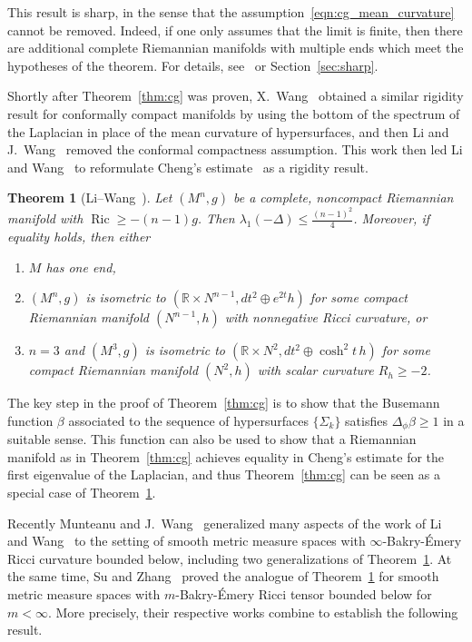 \documentclass{amsart}
\newtheorem{thm}{Theorem}[section]
\theoremstyle{definition}
\theoremstyle{remark}
\numberwithin{equation}{section}
\begin{document}
This result is sharp, in the sense that the assumption~\eqref{eqn:cg_mean_curvature} cannot be removed.  Indeed, if one only assumes that the limit is finite, then there are additional complete Riemannian manifolds with multiple ends which meet the hypotheses of the theorem.  For details, see~\cite{CaiGalloway1999} or Section~\ref{sec:sharp}.

Shortly after Theorem~\ref{thm:cg} was proven, X.\ Wang~\cite{Wang2001} obtained a similar rigidity result for conformally compact manifolds by using the bottom of the spectrum of the Laplacian in place of the mean curvature of hypersurfaces, and then Li and J.\ Wang~\cite{LiWang2001} removed the conformal compactness assumption.  This work then led Li and Wang~\cite{LiWang2002} to reformulate Cheng's estimate~\cite{Cheng1975} as a rigidity result.

\begin{thm}[Li--Wang~\cite{LiWang2002}]
\label{thm:lw}
Let $(M^n,g)$ be a complete, noncompact Riemannian manifold with $\operatorname{Ric}\geq-(n-1)g$.  Then $\lambda_1(-\Delta)\leq\frac{(n-1)^2}{4}$.  Moreover, if equality holds, then either
\begin{enumerate}
\item $M$ has one end,
\item $(M^n,g)$ is isometric to $({\mathbb{R}}\times N^{n-1},dt^2\oplus e^{2t}h)$ for some compact Riemannian manifold $(N^{n-1},h)$ with nonnegative Ricci curvature, or
\item $n=3$ and $(M^3,g)$ is isometric to $({\mathbb{R}}\times N^2,dt^2\oplus\cosh^2t\,h)$ for some compact Riemannian manifold $(N^2,h)$ with scalar curvature $R_h\geq-2$.
\end{enumerate}
\end{thm}

The key step in the proof of Theorem~\ref{thm:cg} is to show that the Busemann function $\beta$ associated to the sequence of hypersurfaces $\{\Sigma_k\}$ satisfies $\Delta_\phi\beta\geq1$ in a suitable sense.  This function can also be used to show that a Riemannian manifold as in Theorem~\ref{thm:cg} achieves equality in Cheng's estimate for the first eigenvalue of the Laplacian, and thus Theorem~\ref{thm:cg} can be seen as a special case of Theorem~\ref{thm:lw}.

Recently Munteanu and J.\ Wang~\cite{MunteanuWang2011,MunteanuWang2011b} generalized many aspects of the work of Li and Wang~\cite{LiWang2001,LiWang2002} to the setting of smooth metric measure spaces with $\infty$-Bakry-\'Emery Ricci curvature bounded below, including two generalizations of Theorem~\ref{thm:lw}.  At the same time, Su and Zhang~\cite{SuZhang2011} proved the analogue of Theorem~\ref{thm:lw} for smooth metric measure spaces with $m$-Bakry-\'Emery Ricci tensor bounded below for $m<\infty$.  More precisely, their respective works combine to establish the following result.
\end{document}

